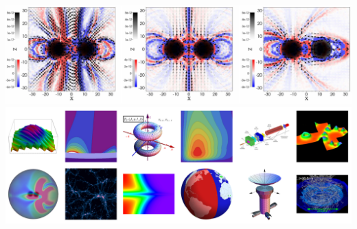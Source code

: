 \begin{frame}
\begin{columns}
\begin{column}{7.5cm}
        \\
        \includegraphics[width=\columnwidth]{figs/plots/mpc/plot_current}
        \\
        \href{http://journals.aps.org/prd/kaleidoscope/August2014}{\includegraphics[width=\columnwidth]{figs/plots/mpc/kaleidoscope_aug2014}}
    \end{column}
    \end{columns}
\end{frame}


